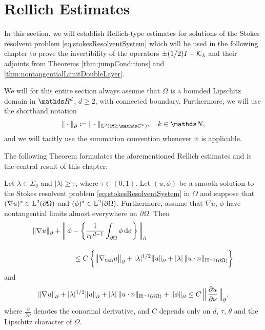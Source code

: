 \chapter{Rellich Estimates}
\label{chap:4}

In this section, we will establish Rellich-type estimates for solutions of the Stokes resolvent problem \eqref{eq:stokesResolventSystem} which will be used in the following chapter to prove the invertibility of the operators $\pm(1/2)I + \mathcal{K}_{\lambda}$ and their adjoints from Theorems  \ref{thm:jumpConditions} and \ref{thm:nontangentialLimitDoubleLayer}.

We will for this entire section always assume that $\Omega$ is a bounded Lipschitz domain in $\R^d$, $d \geq 2$, with connected boundary.
Furthermore, we will use the shorthand notation
\begin{align*}
    \| \cdot \|^{}_{\partial} \coloneqq \| \cdot \|_{\Ell^2(\partial\Omega; \C^k)}, \quad k \in \N,
\end{align*}
and we will tacitly use the summation convention whenever it is applicable.

The following Theorem formulates the aforementioned Rellich estimates and is the central result of this chapter:

\begin{thm}
  \label{thm:rellich}
  Let $\lambda \in \Sigma_\theta$ and $|\lambda| \geq \tau$, where 
  $\tau \in (0,1)$.
  Let $(u,\phi)$ be a smooth solution to the Stokes resolvent problem \eqref{eq:stokesResolventSystem} in $\Omega$ and suppose that $(\nabla u)^* \in \mathrm{L}^2(\partial\Omega)$ and $(\phi)^* \in \mathrm{L}^2(\partial\Omega)$.
  Furthermore, assume that $\nabla u$, $\phi$ have nontangential limits almost everywhere on $\partial\Omega$.
  Then
  \begin{align}
    \label{eq:rellich1}
    \begin{alignedat}{1}
        &\|\nabla u\|^{}_\partial + \bigg\|\,\phi - \bigg\{ \frac{1}{{r_0}^{d - 1}}\int_{\partial\Omega} \phi \, {\operatorname{d}\!{\sigma}} \bigg\} \, \bigg\|^{}_\partial \\[1em]
      &\hspace{2cm} \leq C\, \bigg\{ \big\|\nabla_{\mathrm{tan}} u\big\|^{}_\partial + |\lambda|^{1/2} \|u\|^{}_\partial + |\lambda| \, \|u \cdot n\|_{\mathrm{H}^{-1}(\partial\Omega)} \bigg\}
    \end{alignedat}
  \end{align}
  and
  \begin{align}
    \label{eq:rellich2}
    \|\nabla u\|^{}_\partial + |\lambda|^{1/2} \|u\|^{}_\partial + |\lambda| \, \|u \cdot n\|_{\mathrm{H}^{-1}(\partial\Omega)} + \|\phi\|^{}_\partial
    \leq C \, \Big\|\, \frac{\partial u}{\partial \nu} \, \Big\|^{}_\partial,
  \end{align}
  where $\frac{\partial}{\partial \nu}$ denotes the conormal derivative, and $C$ depends only on $d$, $\tau$, $\theta$ and the Lipschitz character of $\Omega$.
\end{thm}

